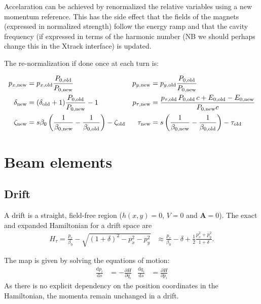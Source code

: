 Accelaration can be achieved by renormalized the relative variables using a new momentum reference. This has the side effect that the fields of the magnets (expressed in normalized strength) follow the energy ramp and that the cavity frequency (if expressed in terms of the harmonic number (NB we should perhaps change this in the Xtrack interface) is updated.

The re-normalization if done once at each turn is:

\begin{align}
p_{x,\rm new} &= p_{x,\rm old} \frac{P_{0,\rm old}}{P_{0,\rm new}} &
p_{y,\rm new} &= p_{y,\rm old} \frac{P_{0,\rm old}}{P_{0,\rm new}} \\
\delta_{\rm new}&= (\delta_{\rm old}+1) \frac{P_{0,\rm old}}{P_{0,\rm new}} -1 &
p_{\tau,\rm new} &= \frac{p_{\tau,\rm old}\, P_{0,\rm old}\,c + E_{0,\rm old} - E_{0,\rm new}}{P_{0,\rm new}c} \\
\zeta_{\rm new} &= s\beta_0 \left(\frac{1}{\beta_{0,\rm new}} -
\frac{1}{\beta_{0,\rm old}}\right) - \zeta_{\rm old} &
\tau_{\rm new} &= s\left(\frac{1}{\beta_{0,\rm new}} -  \frac{1}{\beta_{0,\rm old}}\right) - \tau_{\rm old} \\
\end{align}





\section{Beam elements}

\subsection{Drift}
A drift is a straight, field-free region ($h(x,y)=0$, $V=0$ and
$\mathbf{A}=0$).  The exact and expanded Hamiltonian for a drift space are
\begin{align}
  H_\tau =
    \frac{p_\tau}{\beta_0}  - \sqrt{(1+\delta)^2 - p_x^2 - p_y^2}
  &\approx
    \frac{p_\tau}{\beta_0} - \delta + \frac{1}{2}\frac{p_x^2+p_y^2}{1+\delta}.
\end{align}

The map is given by solving the equations of motion:
\begin{align}
  \frac{\text{d} p_i}{\text{d}s} &= -\frac{\partial H}{\partial q_i} &
  \frac{\text{d} q_i}{\text{d}s} &=  \frac{\partial H}{\partial p_i} 
\end{align}
As there is no explicit dependency on the position coordinates in the Hamiltonian, the
momenta remain unchanged in a drift.

